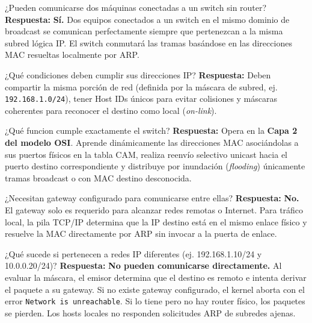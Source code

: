 \documentclass[11pt,a4paper]{article}
\begin{document}
\begin{pregunta}{¿Pueden comunicarse dos máquinas conectadas a un switch sin router?}
    \textbf{Respuesta:} \textbf{Sí.} Dos equipos conectados a un switch en el mismo dominio de broadcast se comunican perfectamente siempre que pertenezcan a la misma subred lógica IP. El switch conmutará las tramas basándose en las direcciones MAC resueltas localmente por ARP.
\end{pregunta}

\begin{pregunta}{¿Qué condiciones deben cumplir sus direcciones IP?}
    \textbf{Respuesta:} Deben compartir la misma porción de red (definida por la máscara de subred, ej. \texttt{192.168.1.0/24}), tener Host IDs únicos para evitar colisiones y máscaras coherentes para reconocer el destino como local (\textit{on-link}).
\end{pregunta}

\begin{pregunta}{¿Qué funcion cumple exactamente el switch?}
    \textbf{Respuesta:} Opera en la \textbf{Capa 2 del modelo OSI}. Aprende dinámicamente las direcciones MAC asociándolas a sus puertos físicos en la tabla CAM, realiza reenvío selectivo unicast hacia el puerto destino correspondiente y distribuye por inundación (\textit{flooding}) únicamente tramas broadcast o con MAC destino desconocida.
\end{pregunta}

\begin{pregunta}{¿Necesitan gateway configurado para comunicarse entre ellas?}
    \textbf{Respuesta:} \textbf{No.} El gateway solo es requerido para alcanzar redes remotas o Internet. Para tráfico local, la pila TCP/IP determina que la IP destino está en el mismo enlace físico y resuelve la MAC directamente por ARP sin invocar a la puerta de enlace.
\end{pregunta}

\begin{pregunta}{¿Qué sucede si pertenecen a redes IP diferentes (ej. 192.168.1.10/24 y 10.0.0.20/24)?}
    \textbf{Respuesta:} \textbf{No pueden comunicarse directamente.} Al evaluar la máscara, el emisor determina que el destino es remoto e intenta derivar el paquete a su gateway. Si no existe gateway configurado, el kernel aborta con el error \texttt{Network is unreachable}. Si lo tiene pero no hay router físico, los paquetes se pierden. Los hosts locales no responden solicitudes ARP de subredes ajenas.
\end{pregunta}
\end{document}
